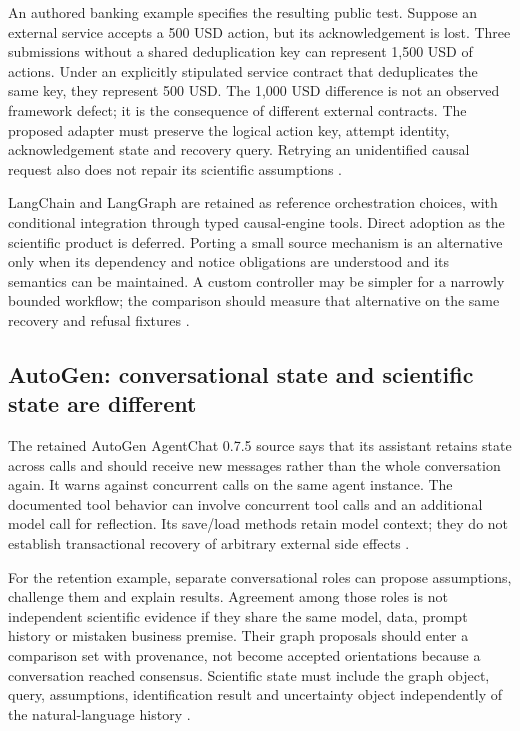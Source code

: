 An authored banking example specifies the resulting public test. Suppose
an external service accepts a 500 USD action, but its acknowledgement is
lost. Three submissions without a shared deduplication key can represent
1,500 USD of actions. Under an explicitly stipulated service contract
that deduplicates the same key, they represent 500 USD. The 1,000 USD
difference is not an observed framework defect; it is the consequence
of different external contracts. The proposed adapter must preserve the
logical action key, attempt identity, acknowledgement state and recovery
query. Retrying an unidentified causal request also does not repair its
scientific assumptions \citep{exec24_framework_contracts}.

LangChain and LangGraph are retained as reference orchestration choices,
with conditional integration through typed causal-engine tools. Direct
adoption as the scientific product is deferred. Porting a small source
mechanism is an alternative only when its dependency and notice obligations
are understood and its semantics can be maintained. A custom controller
may be simpler for a narrowly bounded workflow; the comparison should
measure that alternative on the same recovery and refusal fixtures
\citep{exec24_framework_contracts}.

\subsection{AutoGen: conversational state and scientific state are different}
The retained AutoGen AgentChat 0.7.5 source says that its assistant retains
state across calls and should receive new messages rather than the whole
conversation again. It warns against concurrent calls on the same agent
instance. The documented tool behavior can involve concurrent tool calls
and an additional model call for reflection. Its save/load methods retain
model context; they do not establish transactional recovery of arbitrary
external side effects
\citep{v12_la04_autogen}.

For the retention example, separate conversational roles can propose
assumptions, challenge them and explain results. Agreement among those
roles is not independent scientific evidence if they share the same
model, data, prompt history or mistaken business premise. Their graph
proposals should enter a comparison set with provenance, not become
accepted orientations because a conversation reached consensus. Scientific
state must include the graph object, query, assumptions, identification
result and uncertainty object independently of the natural-language history
\citep{exec24_framework_contracts}.

